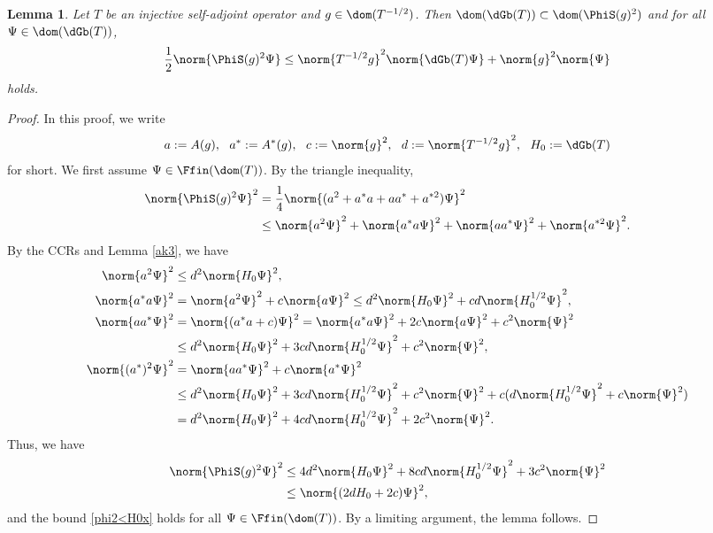 \documentclass[12pt]{article}
\theoremstyle{plain}
\newtheorem{lem}[theorem]{\bf Lemma}
\numberwithin{equation}{section}
\theoremstyle{remark}
\begin{document}
\begin{lem}{\label{phi2<H0}}
Let $T$ be an injective self-adjoint operator and $g\in\dom(T^{-1/2})$.
Then $\dom(\dGb(T))\subset \dom(\PhiS(g)^2)$ and for all $\Psi\in\dom(\dGb(T))$,
\begin{align}
  \frac{1}{2} \norm{\PhiS(g)^2\Psi} 
 \leq \norm{T^{-1/2}g}^2 \norm{\dGb(T)\Psi} + \norm{g}^2\norm{\Psi} \label{phi2<H0x}
\end{align}
holds.
\end{lem}
\begin{proof}
In this proof, we write
\begin{align*}
 a:=A(g), ~~ a^*:=A^*(g), ~~ 
 c:=\norm{g}^2, ~~ d:=\norm{T^{-1/2}g}^2, ~~
 H_0 := \dGb(T)
\end{align*}
for short. 
We first assume $\Psi\in\Ffin(\dom(T))$.
By the triangle inequality,
\begin{align*}
 \norm{\PhiS(g)^2\Psi}^2 
 & = \frac{1}{4} \norm{(a^2 + a^*a + aa^* + a^{*2})\Psi}^2 \\
 & \leq \norm{a^2\Psi}^2 + \norm{a^*a\Psi}^2 + \norm{aa^*\Psi}^2 + \norm{a^{*2}\Psi}^2.
\end{align*}
By the CCRs and Lemma \ref{ak3}, we have
\begin{align*}
 \norm{a^2\Psi}^2 
&\leq d^2 \norm{H_0\Psi}^2, \\
 \norm{a^*a\Psi}^2 
& = \norm{a^2\Psi}^2 + c\norm{a\Psi}^2
  \leq d^2\norm{H_0\Psi}^2 + cd\norm{H_0^{1/2}\Psi}^2, \\
\norm{aa^*\Psi}^2 
& = \norm{(a^*a+c)\Psi}^2 
  = \norm{a^*a\Psi}^2 + 2c\norm{a\Psi}^2 + c^2\norm{\Psi}^2 \\
& \leq d^2\norm{H_0\Psi}^2+3cd\norm{H_0^{1/2}\Psi}^2 + c^2\norm{\Psi}^2, \\
\norm{(a^*)^2\Psi}^2 
 & = \norm{aa^*\Psi}^2 + c\norm{a^*\Psi}^2 \\
 & \leq  d^2\norm{H_0\Psi}^2+3cd\norm{H_0^{1/2}\Psi}^2 + c^2\norm{\Psi}^2 
   + c(d\norm{H_0^{1/2}\Psi}^2+c\norm{\Psi}^2) \\
 & =  d^2\norm{H_0\Psi}^2+4cd\norm{H_0^{1/2}\Psi}^2 + 2c^2\norm{\Psi}^2.
\end{align*}
Thus, we have
\begin{align*}
  \norm{\PhiS(g)^2\Psi}^2
& \leq 4d^2\norm{H_0\Psi}^2 + 8cd\norm{H_0^{1/2}\Psi}^2 + 3c^2\norm{\Psi}^2 \\
& \leq \norm{(2dH_0+2c)\Psi}^2,
\end{align*}
and the bound \eqref{phi2<H0x} holds for all $\Psi\in\Ffin(\dom(T))$.
By a limiting argument, the lemma follows.
\end{proof}
\end{document}
